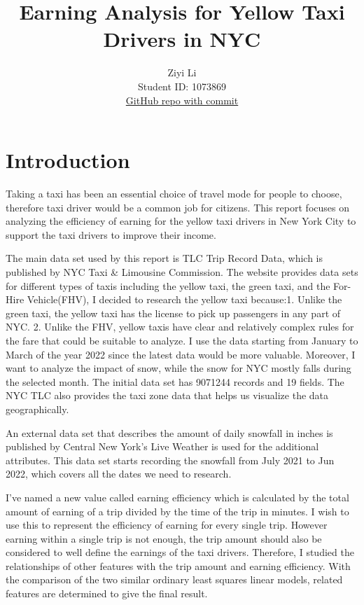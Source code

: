 \documentclass[11pt]{article}
\title{\textbf{Earning Analysis for Yellow Taxi Drivers in NYC}}
\author{
Ziyi Li \\
Student ID: 1073869 \\
\href{https://github.com/MAST30034-Applied-Data-Science/mast30034-project-1-LZY-Ziyi.git}{GitHub repo with commit}
}
\begin{document}
\maketitle

\section{Introduction}
Taking a taxi has been an essential choice of travel mode for people to choose, therefore taxi driver would be a common job for citizens. This report focuses on analyzing the efficiency of earning for the yellow taxi drivers in New York City to support the taxi drivers to improve their income.

The main data set used by this report is TLC Trip Record Data, which is published by NYC Taxi \& Limousine Commission\cite{TLCdata}. The website provides data sets for different types of taxis including the yellow taxi, the green taxi, and the For-Hire Vehicle(FHV), I decided to research the yellow taxi because:1. Unlike the green taxi, the yellow taxi has the license to pick up passengers in any part of NYC. 2. Unlike the FHV, yellow taxis have clear and relatively complex rules for the fare that could be suitable to analyze. I use the data starting from January to March of the year 2022 since the latest data would be more valuable. Moreover, I want to analyze the impact of snow, while the snow for NYC mostly falls during the selected month. The initial data set has 9071244 records and 19 fields. The NYC TLC also provides the taxi zone data that helps us visualize the data geographically.

An external data set that describes the amount of daily snowfall in inches is published by Central New York's Live Weather\cite{2021-22snowFall} is used for the additional attributes. This data set starts recording the snowfall from July 2021 to Jun 2022, which covers all the dates we need to research.

I've named a new value called earning efficiency which is calculated by the total amount of earning of a trip divided by the time of the trip in minutes. I wish to use this to represent the efficiency of earning for every single trip. However earning within a single trip is not enough, the trip amount should also be considered to well define the earnings of the taxi drivers. Therefore, I studied the relationships of other features with the trip amount and earning efficiency. With the comparison of the two similar ordinary least squares linear models, related features are determined to give the final result.
\end{document}
